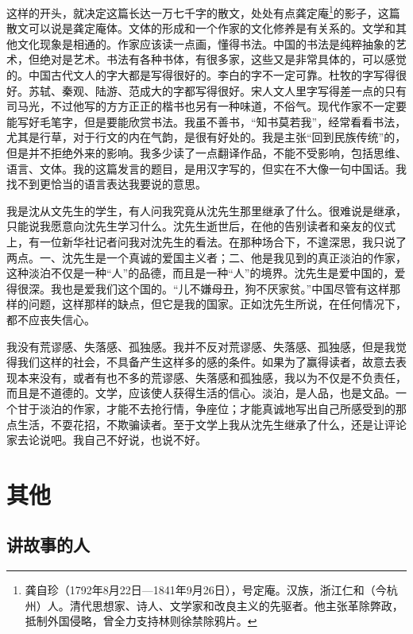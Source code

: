 \documentclass[fontset=fandol,12pt,a5paper]{ctexbook}
\begin{document}
这样的开头，就决定这篇长达一万七千字的散文，处处有点龚定庵\footnote{龚自珍（1792年8月22日—1841年9月26日），号定庵。汉族，浙江仁和（今杭州）人。清代思想家、诗人、文学家和改良主义的先驱者。他主张革除弊政，抵制外国侵略，曾全力支持林则徐禁除鸦片。}的影子，这篇散文可以说是龚定庵体。文体的形成和一个作家的文化修养是有关系的。文学和其他文化现象是相通的。作家应该读一点画，懂得书法。中国的书法是纯粹抽象的艺术，但绝对是艺术。书法有各种书体，有很多家，这些又是非常具体的，可以感觉的。中国古代文人的字大都是写得很好的。李白的字不一定可靠。杜牧的字写得很好。苏轼、秦观、陆游、范成大的字都写得很好。宋人文人里字写得差一点的只有司马光，不过他写的方方正正的楷书也另有一种味道，不俗气。现代作家不一定要能写好毛笔字，但是要能欣赏书法。我虽不善书，“知书莫若我”，经常看看书法，尤其是行草，对于行文的内在气韵，是很有好处的。我是主张“回到民族传统”的，但是并不拒绝外来的影响。我多少读了一点翻译作品，不能不受影响，包括思维、语言、文体。我的这篇发言的题目，是用汉字写的，但实在不大像一句中国话。我找不到更恰当的语言表达我要说的意思。

我是沈从文先生的学生，有人问我究竟从沈先生那里继承了什么。很难说是继承，只能说我愿意向沈先生学习什么。沈先生逝世后，在他的告别读者和亲友的仪式上，有一位新华社记者问我对沈先生的看法。在那种场合下，不遑深思，我只说了两点。一、沈先生是一个真诚的爱国主义者；二、他是我见到的真正淡泊的作家，这种淡泊不仅是一种“人”的品德，而且是一种“人”的境界。沈先生是爱中国的，爱得很深。我也是爱我们这个国的。“儿不嫌母丑，狗不厌家贫。”中国尽管有这样那样的问题，这样那样的缺点，但它是我的国家。正如沈先生所说，在任何情况下，都不应丧失信心。

我没有荒谬感、失落感、孤独感。我并不反对荒谬感、失落感、孤独感，但是我觉得我们这样的社会，不具备产生这样多的感的条件。如果为了赢得读者，故意去表现本来没有，或者有也不多的荒谬感、失落感和孤独感，我以为不仅是不负责任，而且是不道德的。文学，应该使人获得生活的信心。淡泊，是人品，也是文品。一个甘于淡泊的作家，才能不去抢行情，争座位；才能真诚地写出自己所感受到的那点生活，不耍花招，不欺骗读者。至于文学上我从沈先生继承了什么，还是让评论家去论说吧。我自己不好说，也说不好。

\newpage

\chapter{其他}

\section{讲故事的人}
\end{document}
